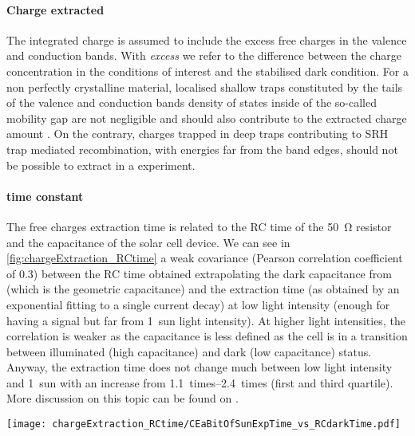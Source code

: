 		\paragraph{Charge extracted}
		The integrated charge is assumed to include the excess free charges in the valence and conduction bands.
		With \emph{excess} we refer to the difference between the charge concentration in the conditions of interest and the stabilised dark condition.
		For a non perfectly crystalline material, localised shallow traps constituted by the tails of the valence and conduction bands density of states inside of the so\hyp{}called mobility gap \cite{Pieters2009} are not negligible and should also contribute to the extracted charge amount \cite{Kirchartz2012,Du2018}.
		On the contrary, charges trapped in deep traps contributing to SRH trap mediated recombination, with energies far from the band edges, should not be possible to extract in a  experiment.

		\paragraph{ time constant}\label{ce_time}
		The free charges extraction time is related to the RC time of the \SI{50}{\ohm} resistor and the capacitance of the solar cell device.
		We can see in \cref{fig:chargeExtraction_RCtime} a weak covariance (Pearson correlation coefficient of 0.3) between the RC time obtained extrapolating the dark capacitance from  (which is the geometric capacitance) and the extraction time (as obtained by an exponential fitting to a single  current decay) at low light intensity (enough for having a signal but far from 1~sun light intensity).
		At higher light intensities, the correlation is weaker as the capacitance is less defined as the cell is in a transition between illuminated (high capacitance) and dark (low capacitance) status.
		Anyway, the extraction time does not change much between low light intensity and 1~sun with an increase from \SIrange{1.1}{2.4}{times} (first and third quartile).
		More discussion on this topic can be found on .

		\begin{SCfigure}%
			\centering
			\texttt{[image: chargeExtraction\_RCtime/CEaBitOfSunExpTime\_vs\_RCdarkTime.pdf]}
			\label{fig:chargeExtraction_RCtime}
		\end{SCfigure}


